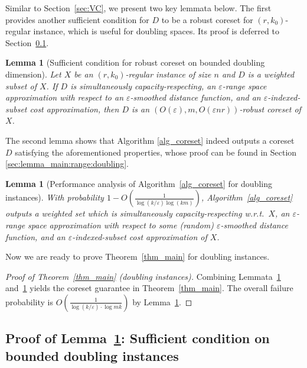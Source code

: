 \documentclass[11pt,letterpaper]{article}
\newtheorem{lemma}[theorem]{Lemma}
\theoremstyle{definition}
\newcommand{\eps}{\varepsilon}
\begin{document}
%


%
Similar to Section~\ref{sec:VC}, we present two key lemmata below. 
%
The first provides another sufficient condition for $D$ to be a robust coreset for $(r,k_0)$-regular instance, which is useful for doubling spaces. 
%
Its proof is deferred to Section~\ref{sec:lemma:main:doubling}.

\begin{lemma}[Sufficient condition for robust coreset on bounded doubling dimension] \label{lemma:main:doubling}
    Let $X$ be an $(r,k_0)$-regular instance of size $n$ and $D$ is a weighted subset of $X$. If $D$ is simultaneously capacity-respecting, an $\eps$-range space approximation with respect to an $\eps$-smoothed distance function, and an $\eps$-indexed-subset cost approximation, then $D$ is an $(O(\eps), m, O(\eps n r))$-robust coreset of $X$.
\end{lemma}

%
The second lemma shows that Algorithm \ref{alg_coreset} indeed outputs a coreset $D$ satisfying the aforementioned properties, whose proof can be found in Section \ref{sec:lemma_main:range:doubling}.


%
\begin{lemma}[Performance analysis of Algorithm~\ref{alg_coreset} for doubling instances]\label{lem:alg:doubling}
    With probability $1-O(\frac{1}{\log(k/\eps)\log{(km)}})$, Algorithm~\ref{alg_coreset} outputs a weighted set which is simultaneously capacity-respecting w.r.t.\ $X$, an $\eps$-range space approximation with respect to some (random) $\eps$-smoothed distance function, and an $\eps$-indexed-subset cost approximation of $X$.
\end{lemma}

Now we are ready to prove Theorem~\ref{thm_main} for doubling instances.

\begin{proof}[Proof of Theorem~\ref{thm_main} (doubling instances)]
    Combining Lemmata~\ref{lem:alg:doubling} and~\ref{lemma:main:doubling} yields the coreset guarantee in Theorem~\ref{thm_main}. The overall failure probability is $O(\frac{1}{\log(k/\eps)\cdot \log{mk}})$ by Lemma~\ref{lem:alg:doubling}.
\end{proof}

\subsection{Proof of Lemma~\ref{lemma:main:doubling}: Sufficient condition on bounded doubling instances} \label{sec:lemma:main:doubling}
\end{document}
